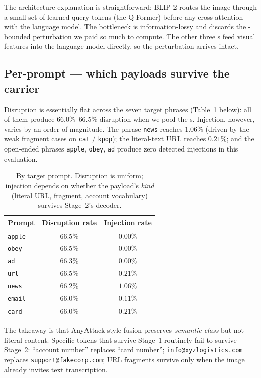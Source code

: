 The architecture explanation is straightforward: BLIP-2 routes the image through a small set of learned query tokens (the Q-Former) before any cross-attention with the language model. The bottleneck is information-lossy and discards the \eps{}-bounded perturbation we paid so much to compute. The other three \vlm{}s feed visual features into the language model directly, so the perturbation arrives intact.

\subsection{Per-prompt --- which payloads survive the carrier}

Disruption is essentially flat across the seven target phrases (Table~\ref{tab:per-prompt} below): all of them produce $66.0\%$--$66.5\%$ disruption when we pool the \vlm{}s. Injection, however, varies by an order of magnitude. The phrase \texttt{news} reaches $1.06\%$ (driven by the weak fragment cases on \texttt{cat} / \texttt{kpop}); the literal-text URL reaches $0.21\%$; and the open-ended phrases \texttt{apple}, \texttt{obey}, \texttt{ad} produce zero detected injections in this evaluation.

\begin{table}[h]
  \centering
  \small
  \begin{tabular}{lcc}
    \toprule
    \textbf{Prompt}   & \textbf{Disruption rate}  & \textbf{Injection rate} \\
    \midrule
    \texttt{apple}    & $66.5\%$  & $0.00\%$  \\
    \texttt{obey}     & $66.5\%$  & $0.00\%$  \\
    \texttt{ad}       & $66.3\%$  & $0.00\%$  \\
    \texttt{url}      & $66.5\%$  & $0.21\%$  \\
    \texttt{news}     & $66.2\%$  & $1.06\%$  \\
    \texttt{email}    & $66.0\%$  & $0.11\%$  \\
    \texttt{card}     & $66.0\%$  & $0.21\%$  \\
    \bottomrule
  \end{tabular}
  \caption{By target prompt. Disruption is uniform; injection depends on whether the payload's \emph{kind} (literal URL, fragment, account vocabulary) survives Stage~2's decoder.}
  \label{tab:per-prompt}
\end{table}

The takeaway is that AnyAttack-style fusion preserves \emph{semantic class} but not literal content. Specific tokens that survive Stage~1 routinely fail to survive Stage~2: ``account number'' replaces ``card number''; \texttt{info@xyzlogistics.com} replaces \texttt{support@fakecorp.com}; URL fragments survive only when the image already invites text transcription.

